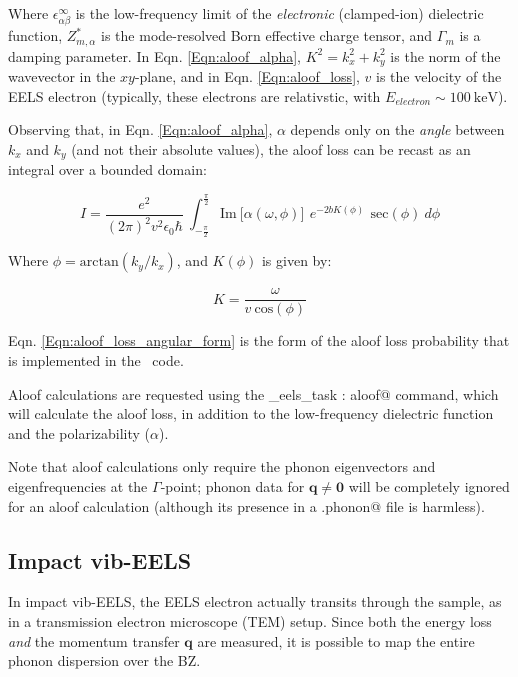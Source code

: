\documentclass[a4paper,11pt,twoside]{book}
\begin{document}
{Where $\epsilon^{\infty}_{\alpha\beta}$ is the low-frequency limit of the \textit{electronic} (clamped-ion) dielectric function, $Z^{*}_{m,\alpha}$ is the mode-resolved Born effective charge tensor, and $\Gamma_{m}$ is a damping parameter. In Eqn. \ref{Eqn:aloof_alpha}, $K^{2} = k_{x}^{2} + k_{y}^{2}$ is the norm of the wavevector in the $xy$-plane, and in Eqn. \ref{Eqn:aloof_loss}, $v$ is the velocity of the EELS electron (typically, these electrons are relativstic, with $E_{electron} \sim 100 \ \mathrm{keV}$).

Observing that, in Eqn. \ref{Eqn:aloof_alpha}, $\alpha$ depends only on the \textit{angle} between $k_{x}$ and $k_{y}$ (and not their absolute values), the aloof loss can be recast as an integral over a bounded domain:

\begin{equation}
    I = 
    \frac{e^2}{(2\pi)^2 v^2\epsilon_0\hbar} \ 
    \int_{-\frac{\pi}{2}}^{\frac{\pi}{2}}
    \mathrm{Im} \ 
    \bigg[ \alpha(\omega,\phi) \bigg]
    \,
     \ e^{-2 b K(\phi)}
    \, \ \mathrm{sec}(\phi) \ d\phi
\label{Eqn:aloof_loss_angular_form}
\end{equation}

Where $\phi = \mathrm{arctan}(k_{y}/k_{x})$, and $K(\phi)$ is given by:

\begin{equation}
    K = \frac{\omega}{v \ \mathrm{cos}(\phi)}
\label{Eqn:aloof_K_phi_relation}
\end{equation}

Eqn. \ref{Eqn:aloof_loss_angular_form} is the form of the aloof loss probability that is implemented in the \optados\ code.

Aloof calculations are requested using the \verb@phonon_eels_task : aloof@ command, which will calculate the aloof loss, in addition to the low-frequency dielectric function and the polarizability ($\alpha$).

Note that aloof calculations only require the phonon eigenvectors and eigenfrequencies at the $\Gamma$-point; phonon data for $\mathbf{q} \neq \mathbf{0}$ will be completely ignored for an aloof calculation (although its presence in a \verb@.phonon@ file is harmless).

\subsection{Impact vib-EELS}

In impact vib-EELS, the EELS electron actually transits through the sample, as in a transmission electron microscope (TEM) setup. Since both the energy loss \textit{and} the momentum transfer $\mathbf{q}$ are measured, it is possible to map the entire phonon dispersion over the BZ.

}
\end{document}
